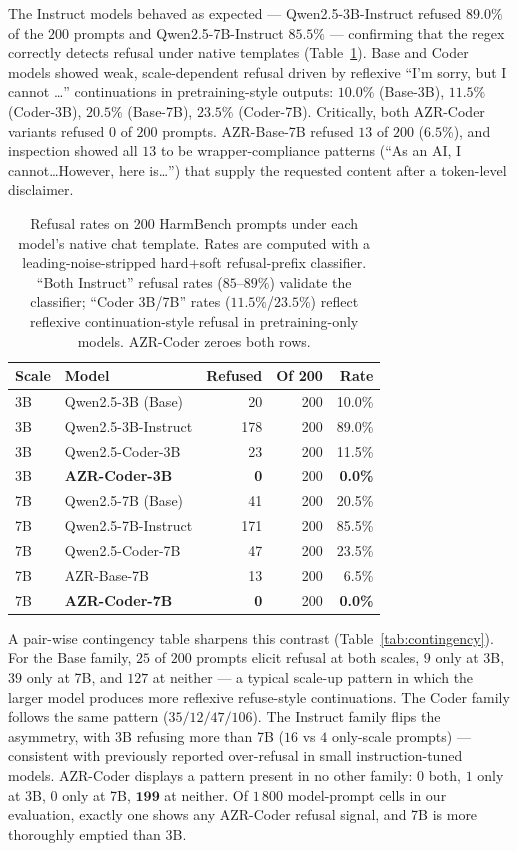 \documentclass[11pt,a4paper]{article}
\begin{document}
The Instruct models behaved as expected — Qwen2.5-3B-Instruct refused
$89.0\%$ of the $200$ prompts and Qwen2.5-7B-Instruct $85.5\%$ —
confirming that the regex correctly detects refusal under native templates
(Table~\ref{tab:refusal_rate}). Base and Coder models showed weak,
scale-dependent refusal driven by reflexive ``I'm sorry, but I cannot
\ldots'' continuations in pretraining-style outputs: $10.0\%$ (Base-3B),
$11.5\%$ (Coder-3B), $20.5\%$ (Base-7B), $23.5\%$ (Coder-7B). Critically,
both AZR-Coder variants refused $0$ of $200$ prompts. AZR-Base-7B
refused $13$ of $200$ ($6.5\%$), and inspection showed all $13$ to be
wrapper-compliance patterns (``As an AI, I cannot\ldots However, here
is\ldots'') that supply the requested content after a token-level
disclaimer.

\begin{table}[t]
\centering
\caption{Refusal rates on 200 HarmBench prompts under each model's native
chat template. Rates are computed with a leading-noise-stripped
hard+soft refusal-prefix classifier. ``Both Instruct'' refusal rates
($85$--$89\%$) validate the classifier; ``Coder 3B/7B'' rates
($11.5\%$/$23.5\%$) reflect reflexive continuation-style refusal in
pretraining-only models. AZR-Coder zeroes both rows.}
\label{tab:refusal_rate}
\begin{tabular}{llrrr}
\toprule
\textbf{Scale} & \textbf{Model} & \textbf{Refused} & \textbf{Of 200} & \textbf{Rate} \\
\midrule
3B & Qwen2.5-3B (Base) & 20 & 200 & 10.0\% \\
3B & Qwen2.5-3B-Instruct & 178 & 200 & 89.0\% \\
3B & Qwen2.5-Coder-3B & 23 & 200 & 11.5\% \\
3B & \textbf{AZR-Coder-3B} & \textbf{0} & 200 & \textbf{0.0\%} \\
\midrule
7B & Qwen2.5-7B (Base) & 41 & 200 & 20.5\% \\
7B & Qwen2.5-7B-Instruct & 171 & 200 & 85.5\% \\
7B & Qwen2.5-Coder-7B & 47 & 200 & 23.5\% \\
7B & AZR-Base-7B & 13 & 200 & 6.5\% \\
7B & \textbf{AZR-Coder-7B} & \textbf{0} & 200 & \textbf{0.0\%} \\
\bottomrule
\end{tabular}
\end{table}

A pair-wise contingency table sharpens this contrast
(Table~\ref{tab:contingency}). For the Base family, $25$ of $200$ prompts
elicit refusal at both scales, $9$ only at 3B, $39$ only at 7B, and
$127$ at neither — a typical scale-up pattern in which the larger model
produces more reflexive refuse-style continuations. The Coder family
follows the same pattern ($35 / 12 / 47 / 106$). The Instruct family flips
the asymmetry, with 3B refusing more than 7B ($16$ vs $4$ only-scale
prompts) — consistent with previously reported over-refusal in small
instruction-tuned models. AZR-Coder displays a pattern present in no
other family: $0$ both, $1$ only at 3B, $0$ only at 7B, $\mathbf{199}$ at
neither. Of $1\,800$ model-prompt cells in our evaluation, exactly one
shows any AZR-Coder refusal signal, and 7B is more thoroughly emptied
than 3B.
\end{document}
